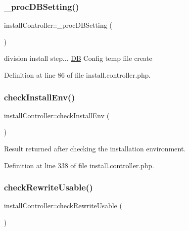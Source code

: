 \subsubsection{\texorpdfstring{\+\_\+proc\+D\+B\+Setting()}{\_procDBSetting()}}
{\footnotesize\ttfamily install\+Controller\+::\+\_\+proc\+D\+B\+Setting (\begin{DoxyParamCaption}{ }\end{DoxyParamCaption})}



division install step... \hyperlink{classDB}{DB} Config temp file create 



Definition at line 86 of file install.\+controller.\+php.

\mbox{\label{classinstallController_a6cd48bffa15badc616c0b860c59d410e}} 
\subsubsection{\texorpdfstring{check\+Install\+Env()}{checkInstallEnv()}}
{\footnotesize\ttfamily install\+Controller\+::check\+Install\+Env (\begin{DoxyParamCaption}{ }\end{DoxyParamCaption})}



Result returned after checking the installation environment. 



Definition at line 338 of file install.\+controller.\+php.

\mbox{\label{classinstallController_ae621886c36c43926d81f6beb56cfde25}} 
\subsubsection{\texorpdfstring{check\+Rewrite\+Usable()}{checkRewriteUsable()}}
{\footnotesize\ttfamily install\+Controller\+::check\+Rewrite\+Usable (\begin{DoxyParamCaption}{ }\end{DoxyParamCaption})}

